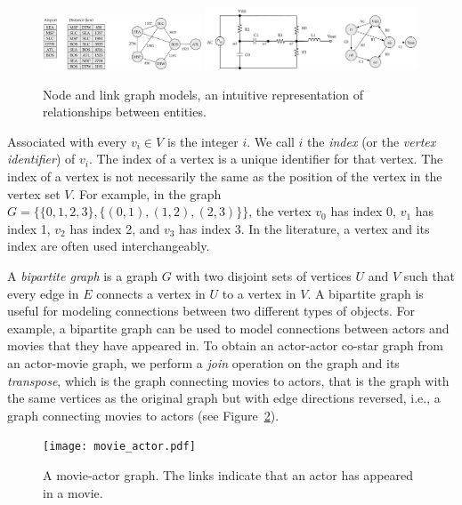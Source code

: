 \begin{figure}[ht]
  \begin{center}
    {\includegraphics[width=0.42\textwidth]{figs/airport.pdf}}
    {\includegraphics[width=0.56\textwidth]{figs/circuit.pdf}}
    \caption{Node and link graph models, an intuitive representation of relationships between entities.\label{fig:node_link_graphs}}
  \end{center}
\end{figure}

Associated with every $v_i \in V$ is the integer $i$. We call $i$ the \emph{index}
(or the \emph{vertex identifier}) of $v_i$. The index of a vertex is a unique
identifier for that vertex. The index of a vertex is not necessarily the same
as the position of the vertex in the vertex set $V$. For example, in the graph
$G = \{ \{ 0, 1, 2, 3 \}, \{ (0, 1), (1, 2), (2, 3) \} \}$, the vertex $v_0$ has index 0,
$v_1$ has index 1, $v_2$ has index 2, and $v_3$ has index 3. In the literature,
a vertex and its index are often used interchangeably.

A \emph{bipartite graph} is a graph $G$ with two disjoint sets of
vertices $U$ and $V$ such that every edge in $E$ connects a vertex
in $U$ to a vertex in $V$. A bipartite graph is useful for modeling
connections between two different types of objects. For example,
a bipartite graph can be used to model connections between
actors and movies that they have appeared in. To obtain
an actor-actor co-star graph from an actor-movie graph, we
perform a \emph{join} operation on the graph and its \emph{transpose}, which is
the graph connecting movies to actors, that is the graph with the same
vertices as the original graph but with edge directions reversed, i.e., a graph
connecting movies to actors (see Figure~\ref{fig:movie_actor}).

\begin{figure}[ht]
  \begin{center}
    \texttt{[image: movie\_actor.pdf]}\label{fig:movie_actor}
    \caption{A movie-actor graph. The links indicate that an actor has appeared in a movie.\label{fig:movie_actor}}
  \end{center}
\end{figure}

